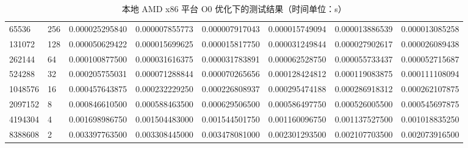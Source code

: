 \documentclass[a4paper]{article}
\begin{document}
\begin{table}[]
{\begin{tabular}{llllllll}
      65536   & 256     & 0.000025295840 & 0.000007855773  & 0.000007917043 & 0.000015749094 & 0.000013886539 & 0.000013085258 \\
      131072  & 128     & 0.000050629422 & 0.000015699625  & 0.000015817750 & 0.000031249844 & 0.000027902617 & 0.000026089438 \\
      262144  & 64      & 0.000100877500 & 0.000031616375  & 0.000031783891 & 0.000062528750 & 0.000055733437 & 0.000052715687 \\
      524288  & 32      & 0.000205755031 & 0.000071288844  & 0.000070265656 & 0.000128424812 & 0.000119083875 & 0.000111108094 \\
      1048576 & 16      & 0.000457643875 & 0.000232229250  & 0.000226808937 & 0.000295474188 & 0.000286918312 & 0.000262107875 \\
      2097152 & 8       & 0.000846610500 & 0.000588463500  & 0.000629506500 & 0.000586497750 & 0.000526005500 & 0.000545697875 \\
      4194304 & 4       & 0.001698986750 & 0.001504483000  & 0.001544501750 & 0.001160096750 & 0.001137527500 & 0.001018835250 \\
      8388608 & 2       & 0.003397763500 & 0.003308445000  & 0.003478081000 & 0.002301293500 & 0.002107703500 & 0.002073916500
    \end{tabular}%
  }
  \caption{本地 AMD x86 平台 O0 优化下的测试结果（时间单位：s）}
  \label{tab:x86-O0-test}
\end{table}
\end{document}
